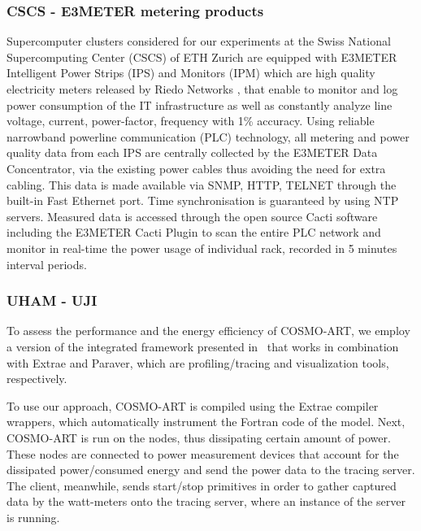 \subsubsection{CSCS - E3METER metering products}
Supercomputer  clusters considered  for our  experiments at  the Swiss
National Supercomputing Center (CSCS)  of ETH Zurich are equipped with
E3METER Intelligent  Power Strips (IPS)  and Monitors (IPM)  which are
high   quality   electricity  meters   released   by  Riedo   Networks
\citep{Riedonetworks},   that  enable   to  monitor   and   log  power
consumption  of the IT  infrastructure as  well as  constantly analyze
line  voltage,  current, power-factor,  frequency  with 1\%  accuracy.
Using  reliable narrowband  powerline communication  (PLC) technology,
all  metering and  power  quality  data from  each  IPS are  centrally
collected  by the E3METER  Data Concentrator,  via the  existing power
cables thus  avoiding the need for  extra cabling.  This  data is made
available via  SNMP, HTTP, TELNET  through the built-in  Fast Ethernet
port.   Time  synchronisation  is  guaranteed by  using  NTP  servers.
Measured  data is  accessed  through the  open  source Cacti  software
including the E3METER Cacti Plugin  to scan the entire PLC network and
monitor in real-time the power usage of individual rack, recorded in 5
minutes interval periods.

\subsubsection{UHAM - UJI}
To assess the  performance and the energy efficiency  of COSMO-ART, we
employ   a    version   of   the    integrated   framework   presented
in~\cite{energy13} that works in  combination with Extrae and Paraver,
which are profiling/tracing and visualization tools, respectively.

To use our  approach, COSMO-ART is compiled using  the Extrae compiler
wrappers,  which  automatically instrument  the  Fortran  code of  the
model. Next, COSMO-ART  is run on the nodes,  thus dissipating certain
amount  of power.   These  nodes are  connected  to power  measurement
devices that account for the dissipated power/consumed energy and send
the power  data to the  tracing server.  The client,  meanwhile, sends
start/stop  primitives  in  order  to  gather  captured  data  by  the
watt-meters onto the  tracing server, where an instance  of the \pmlib
server is running.

